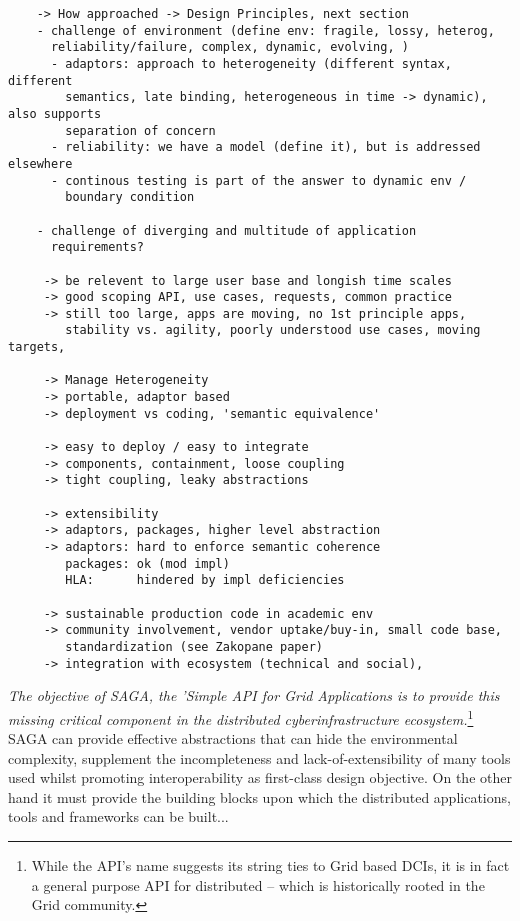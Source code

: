 \documentclass[a4paper,12pt]{article}
\begin{document}
\begin{verbatim}
    -> How approached -> Design Principles, next section
    - challenge of environment (define env: fragile, lossy, heterog,
      reliability/failure, complex, dynamic, evolving, ) 
      - adaptors: approach to heterogeneity (different syntax, different
        semantics, late binding, heterogeneous in time -> dynamic), also supports 
        separation of concern
      - reliability: we have a model (define it), but is addressed elsewhere
      - continous testing is part of the answer to dynamic env /
        boundary condition

    - challenge of diverging and multitude of application
      requirements?

     -> be relevent to large user base and longish time scales
     -> good scoping API, use cases, requests, common practice
     -> still too large, apps are moving, no 1st principle apps,
        stability vs. agility, poorly understood use cases, moving targets, 

     -> Manage Heterogeneity
     -> portable, adaptor based
     -> deployment vs coding, 'semantic equivalence'
  
     -> easy to deploy / easy to integrate
     -> components, containment, loose coupling
     -> tight coupling, leaky abstractions
  
     -> extensibility
     -> adaptors, packages, higher level abstraction
     -> adaptors: hard to enforce semantic coherence
        packages: ok (mod impl)
        HLA:      hindered by impl deficiencies
  
     -> sustainable production code in academic env
     -> community involvement, vendor uptake/buy-in, small code base,
        standardization (see Zakopane paper)
     -> integration with ecosystem (technical and social), 
   \end{verbatim}

 {\it The objective of SAGA, the 'Simple API for Grid Applications is
   to provide this missing critical component in the distributed
   cyberinfrastructure ecosystem.}\footnote{While the API's name
   suggests its string ties to Grid based DCIs, it is in fact a
   general purpose API for distributed -- which is historically rooted
   in the Grid community.}  SAGA can provide effective abstractions
 that can hide the environmental complexity, supplement the
 incompleteness and lack-of-extensibility of many tools used whilst
 promoting interoperability as first-class design objective.  On the
 other hand it must provide the building blocks upon which the
 distributed applications, tools and frameworks can be built...
\end{document}
